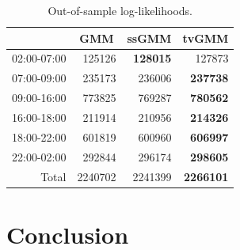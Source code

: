 \documentclass[12pt]{article}
\theoremstyle{definition}
\theoremstyle{algodesc}
\begin{document}
\begin{table}[htb] \centering
\begin{tabular}{rrrr}
  \toprule
   & \multicolumn{1}{c}{GMM} & \multicolumn{1}{c}{ssGMM} & \multicolumn{1}{c}{tvGMM} \\
  \midrule
  02:00-07:00 &  125126 &  \textbf{128015} &  127873 \\
  07:00-09:00 &  235173 &  236006 &  \textbf{237738} \\
  09:00-16:00 &  773825 &  769287 &  \textbf{780562} \\
  16:00-18:00 &  211914 &  210956 &  \textbf{214326} \\
  18:00-22:00 &  601819 &  600960 &  \textbf{606997} \\
  22:00-02:00 &  292844 &  296174 &  \textbf{298605} \\
  \midrule
  Total       & 2240702 & 2241399 & \textbf{2266101} \\
  \bottomrule
\end{tabular}
\caption{Out-of-sample log-likelihoods.}
\label{tab:logliks}
\end{table}





\section{Conclusion}




\end{document}
